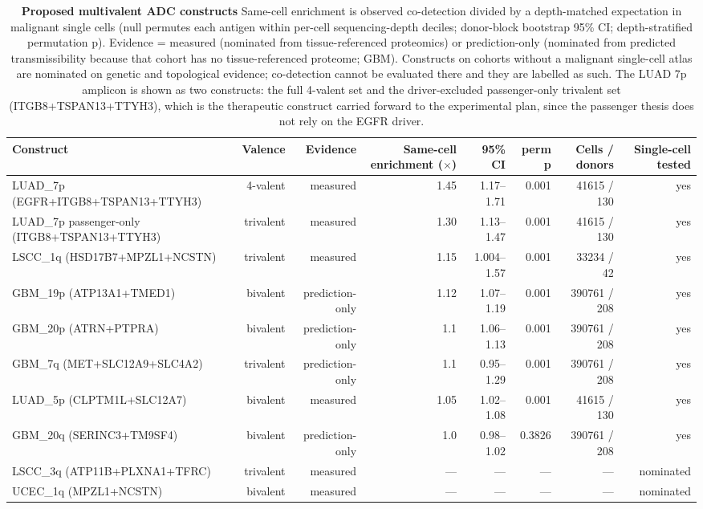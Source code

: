 \documentclass[times, twoside]{zHenriquesLab-StyleBioRxiv}
\begin{document}
\begin{table}[tbp]
\centering
{\scriptsize
\begin{tabular}{@{}lrrrrrrr@{}}
\toprule
\textbf{Construct} & \textbf{Valence} & \textbf{Evidence} & \textbf{Same-cell enrichment ($\times$)} & \textbf{95\% CI} & \textbf{perm p} & \textbf{Cells / donors} & \textbf{Single-cell tested} \\
\midrule
LUAD\_7p (EGFR+ITGB8+TSPAN13+TTYH3) & 4-valent & measured & 1.45 & 1.17--1.71 & 0.001 & 41615 / 130 & yes \\
LUAD\_7p passenger-only (ITGB8+TSPAN13+TTYH3) & trivalent & measured & 1.30 & 1.13--1.47 & 0.001 & 41615 / 130 & yes \\
LSCC\_1q (HSD17B7+MPZL1+NCSTN) & trivalent & measured & 1.15 & 1.004--1.57 & 0.001 & 33234 / 42 & yes \\
GBM\_19p (ATP13A1+TMED1) & bivalent & prediction-only & 1.12 & 1.07--1.19 & 0.001 & 390761 / 208 & yes \\
GBM\_20p (ATRN+PTPRA) & bivalent & prediction-only & 1.1 & 1.06--1.13 & 0.001 & 390761 / 208 & yes \\
GBM\_7q (MET+SLC12A9+SLC4A2) & trivalent & prediction-only & 1.1 & 0.95--1.29 & 0.001 & 390761 / 208 & yes \\
LUAD\_5p (CLPTM1L+SLC12A7) & bivalent & measured & 1.05 & 1.02--1.08 & 0.001 & 41615 / 130 & yes \\
GBM\_20q (SERINC3+TM9SF4) & bivalent & prediction-only & 1.0 & 0.98--1.02 & 0.3826 & 390761 / 208 & yes \\
LSCC\_3q (ATP11B+PLXNA1+TFRC) & trivalent & measured & --- & --- & --- & --- & nominated \\
UCEC\_1q (MPZL1+NCSTN) & bivalent & measured & --- & --- & --- & --- & nominated \\
\bottomrule
\end{tabular}
}
\caption{\textbf{Proposed multivalent ADC constructs} Same-cell enrichment is observed co-detection divided by a depth-matched expectation in malignant single cells (null permutes each antigen within per-cell sequencing-depth deciles; donor-block bootstrap 95\% CI; depth-stratified permutation p). Evidence = measured (nominated from tissue-referenced proteomics) or prediction-only (nominated from predicted transmissibility because that cohort has no tissue-referenced proteome; GBM). Constructs on cohorts without a malignant single-cell atlas are nominated on genetic and topological evidence; co-detection cannot be evaluated there and they are labelled as such. The LUAD 7p amplicon is shown as two constructs: the full 4-valent set and the driver-excluded passenger-only trivalent set (ITGB8+TSPAN13+TTYH3), which is the therapeutic construct carried forward to the experimental plan, since the passenger thesis does not rely on the EGFR driver.}
\label{tab:constructs}
\end{table}
\end{document}
